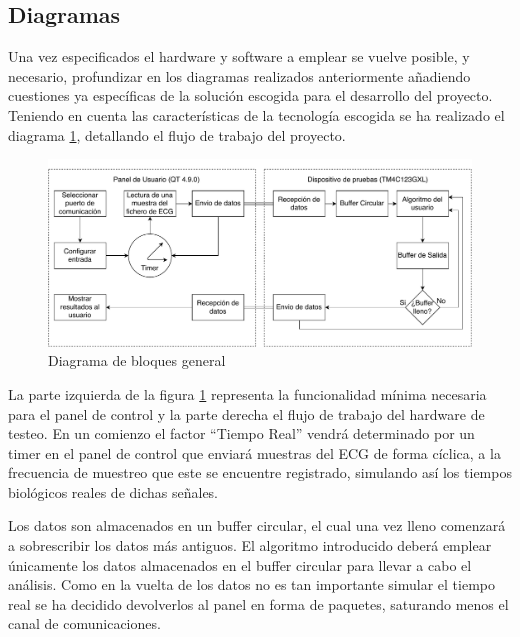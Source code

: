         \subsection{Diagramas}

        Una vez especificados el hardware y software a emplear se vuelve posible, y necesario, profundizar en los diagramas realizados anteriormente añadiendo cuestiones ya específicas de la solución escogida para el desarrollo del proyecto. Teniendo en cuenta las características de la tecnología escogida se ha realizado el diagrama \ref{fig:InternalBlocksDiagram}, detallando el flujo de trabajo del proyecto.

        \begin{figure}[H]  
            \centering
                \includegraphics[width =\linewidth]{figuras/InternBlockDiagram.pdf}
                \caption{Diagrama de bloques general}
                \label{fig:InternalBlocksDiagram}
        \end{figure}
 
        La parte izquierda de la figura \ref{fig:InternalBlocksDiagram} representa la funcionalidad mínima necesaria para el panel de control y la parte derecha el flujo de trabajo del hardware de testeo. En un comienzo el factor “Tiempo Real” vendrá determinado por un timer en el panel de control que enviará muestras del ECG de forma cíclica, a la frecuencia de muestreo que este se encuentre registrado, simulando así los tiempos biológicos reales de dichas señales. 
        
        Los datos son almacenados en un buffer circular, el cual una vez lleno comenzará a sobrescribir los datos más antiguos. El algoritmo introducido deberá emplear únicamente los datos almacenados en el buffer circular para llevar a cabo el análisis. Como en la vuelta de los datos no es tan importante simular el tiempo real se ha decidido devolverlos al panel en forma de paquetes, saturando menos el canal de comunicaciones.
        
